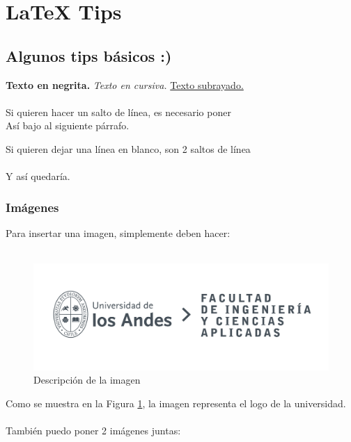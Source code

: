 \documentclass{article} %
\begin{document}
\section{LaTeX Tips}

\subsection{Algunos tips básicos :)}
\textbf{Texto en negrita.} 
\textit{Texto en cursiva.} 
\underline{Texto subrayado.}
\\ \\
Si quieren hacer un salto de línea, es necesario poner \\
Así bajo al siguiente párrafo.

Si quieren dejar una línea en blanco, son 2 saltos de línea \\ \\
Y así quedaría.

\subsubsection{Imágenes}

Para insertar una imagen, simplemente deben hacer:
\\ \\

\begin{figure}[H] %
    \centering
    \includegraphics[width=0.8\linewidth]{LOGO_UNIVERSIDAD.jpg}
    \caption{Descripción de la imagen}
    \label{fig:LOGO}
\end{figure}

Como se muestra en la Figura \ref{fig:LOGO}, la imagen representa el logo de la universidad.
\\ \\
También puedo poner 2 imágenes juntas:
\end{document}
